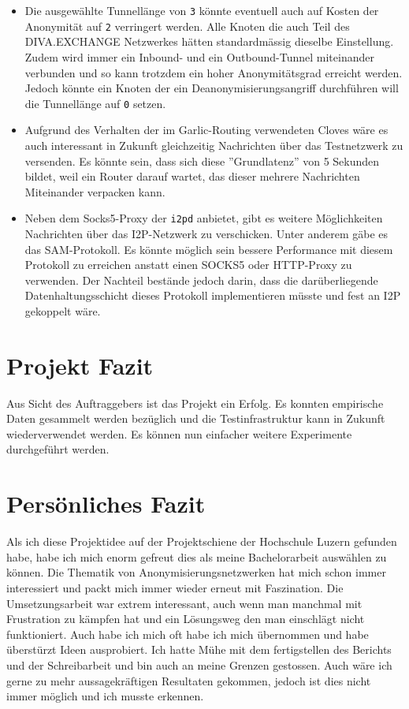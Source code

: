 \begin{itemize}
 \item Die ausgewählte Tunnellänge von \lstinline|3| könnte eventuell auch auf Kosten der Anonymität auf \lstinline|2| verringert werden. Alle Knoten die auch Teil des DIVA.EXCHANGE Netzwerkes hätten standardmässig dieselbe Einstellung.
Zudem wird immer ein Inbound- und ein Outbound-Tunnel miteinander verbunden und so kann trotzdem ein hoher Anonymitätsgrad erreicht werden.
Jedoch könnte ein Knoten der ein Deanonymisierungsangriff durchführen will die Tunnellänge auf \lstinline|0| setzen.
  \item Aufgrund des Verhalten der im Garlic-Routing verwendeten Cloves wäre es auch interessant in Zukunft gleichzeitig Nachrichten über das Testnetzwerk zu versenden. Es könnte sein, dass sich diese ''Grundlatenz'' von 5 Sekunden bildet, weil ein Router darauf wartet, das dieser mehrere Nachrichten Miteinander verpacken kann.
  \item Neben dem Socks5-Proxy der \lstinline|i2pd| anbietet, gibt es weitere Möglichkeiten Nachrichten über das I2P-Netzwerk zu verschicken.
    Unter anderem gäbe es das SAM-Protokoll. Es könnte möglich sein bessere Performance mit diesem Protokoll zu erreichen anstatt einen SOCKS5 oder HTTP-Proxy zu verwenden. \cite{noauthor_sam_nodate}
    Der Nachteil bestände jedoch darin, dass die darüberliegende Datenhaltungsschicht dieses Protokoll implementieren müsste und fest an I2P gekoppelt wäre.
\end{itemize}


\section{Projekt Fazit}

Aus Sicht des Auftraggebers ist das Projekt ein Erfolg. Es konnten empirische Daten gesammelt werden bezüglich und die Testinfrastruktur kann in Zukunft wiederverwendet werden. Es können nun einfacher weitere Experimente durchgeführt werden.


\section{Persönliches Fazit}

Als ich diese Projektidee auf der Projektschiene der Hochschule Luzern gefunden habe, habe ich mich enorm gefreut dies als meine Bachelorarbeit auswählen zu können.
Die Thematik von Anonymisierungsnetzwerken hat mich schon immer interessiert und packt mich immer wieder erneut mit Faszination.
Die Umsetzungsarbeit war extrem interessant, auch wenn man manchmal mit Frustration zu kämpfen hat und ein Lösungsweg den man einschlägt nicht funktioniert.
Auch habe ich mich oft habe ich mich übernommen und habe überstürzt Ideen ausprobiert.
Ich hatte Mühe mit dem fertigstellen des Berichts und der Schreibarbeit und bin auch an meine Grenzen gestossen.
Auch wäre ich gerne zu mehr aussagekräftigen Resultaten gekommen, jedoch ist dies nicht immer möglich und ich musste erkennen.
